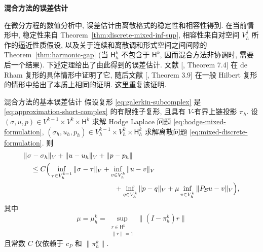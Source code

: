 \medskip\noindent\textbf{{混合方法的误差估计}}\par
在微分方程的数值分析中, 误差估计由离散格式的稳定性和相容性得到. 在当前情形中, 稳定性来自 Theorem~\ref{thm:discrete-mixed-inf-sup}, 相容性来自对空间 $V_h^j$ 所作的逼近性质假设, 以及关于连续和离散调和形式空间之间间隙的 Theorem~\ref{thm:harmonic-gap} (当 $\mathsf H_h^k$ 不包含于 $\mathsf H^k$, 因而混合方法非协调时, 需要后一个结果). 下述定理给出了由此得到的误差估计. 文献 [, Theorem 7.4] 在 de Rham 复形的具体情形中证明了它, 随后文献 [, Theorem 3.9] 在一般 Hilbert 复形的情形中给出了本质上相同的证明. 这里重复该证明.

\begin{Theorem}{{混合方法的基本误差估计}}\label{thm:mixed-basic-error}
假设复形 \eqref{eq:galerkin-subcomplex} 是 \eqref{eq:approximation-short-complex} 的有限维子复形, 且具有 $V$-有界上链投影 $\pi_h$. 设 $(\sigma,u,p)\in V^{k-1}\times V^k\times\mathsf H^k$ 求解 Hodge Laplace 问题 \eqref{eq:hodge-mixed-formulation}, $(\sigma_h,u_h,p_h)\in V_h^{k-1}\times V_h^k\times\mathsf H_h^k$ 求解离散问题 \eqref{eq:mixed-discrete-formulation}. 则
\[
\begin{aligned}
&\|\sigma-\sigma_h\|_V+\|u-u_h\|_V+\|p-p_h\|\\
&\quad\leq C\Big(\inf_{\tau\in V_h^{k-1}}\|\sigma-\tau\|_V+\inf_{v\in V_h^k}\|u-v\|_V\\
&\hspace{45mm}+\inf_{q\in V_h^k}\|p-q\|_V+\mu\inf_{v\in V_h^k}\|P_{\mathcal B}u-v\|_V\Big),
\end{aligned}
\]
其中
\[
\mu=\mu_h^k=\sup_{\substack{r\in\mathsf H^k\\\|r\|=1}}\|(I-\pi_h^k)r\|
\]
且常数 $C$ 仅依赖于 $c_P$ 和 $\|\pi_h^k\|$.
\end{Theorem}

